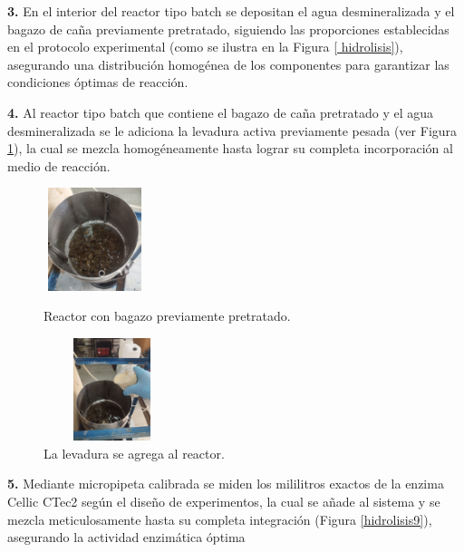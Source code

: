 \documentclass[12pt]{article}
\begin{document}
		 
	     \textbf{3.} En el interior del reactor tipo batch se depositan el agua desmineralizada y el bagazo de caña previamente pretratado, siguiendo las proporciones establecidas en el protocolo experimental (como se ilustra en la Figura \ref{ hidrolisis}), asegurando una distribución homogénea de los componentes para garantizar las condiciones óptimas de reacción.
	     	
	     \textbf{4.} Al reactor tipo batch que contiene el bagazo de caña pretratado y el agua desmineralizada se le adiciona la levadura activa previamente pesada (ver Figura \ref{hidrolisis4}), la cual se mezcla homogéneamente hasta lograr su completa incorporación al medio de reacción. 
	     
	    
	     
	      
	     \begin{figure}[H]
	     	\centering
	     	\begin{minipage}{0.46\textwidth}
	     		\centering
	     		\includegraphics[width=3cm, height=3cm]{imagenes/hidrolisis1} %
	     		\caption{ Reactor con bagazo previamente pretratado.}
	     		\label{ hidrolisis}
	     	\end{minipage}
	     	\hfill
	     	\begin{minipage}{0.48\textwidth}
	     		\centering
	     		\includegraphics[width=4cm, height=3cm]{imagenes/hidrolisis4 } %
	     		\caption{La levadura se agrega al reactor.}
	     		\label{hidrolisis4}
	     	\end{minipage}
	     \end{figure}
	     
	     
	     \textbf{5.} Mediante micropipeta calibrada se miden los mililitros exactos de la enzima Cellic CTec2 según el diseño de experimentos, la cual se añade al sistema y se mezcla meticulosamente hasta su completa integración (Figura \ref{hidrolisis9}), asegurando la actividad enzimática óptima	\\ 
	     	
\end{document}
